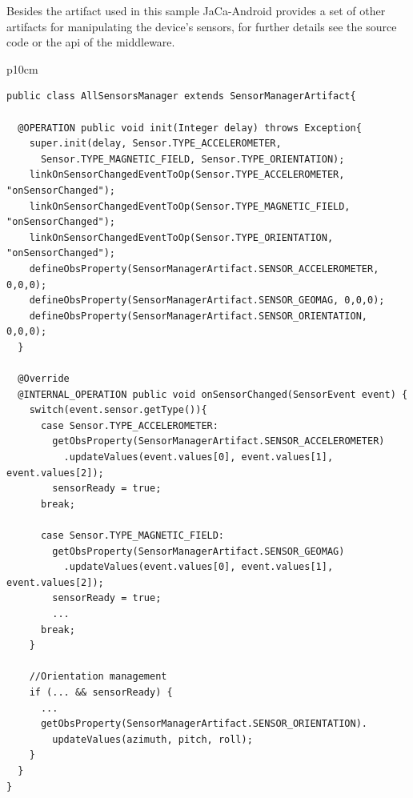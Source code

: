 \documentclass[11pt]{report}
\newcommand\labeltab[1]{\label{tb:#1}}
\newcommand{\jacandroid}{\textsf{JaCa-Android}}
\begin{document}
Besides the artifact used in this sample \jacandroid{} provides a set of other artifacts for manipulating the device's sensors, for further details see the source code or the api of the middleware.


\begin{table}[!ht]
\begin{tabular} {p{10cm}}
\begin{minipage}{10cm}
{\scriptsize \begin{verbatim}
public class AllSensorsManager extends SensorManagerArtifact{

  @OPERATION public void init(Integer delay) throws Exception{
    super.init(delay, Sensor.TYPE_ACCELEROMETER,
      Sensor.TYPE_MAGNETIC_FIELD, Sensor.TYPE_ORIENTATION);
    linkOnSensorChangedEventToOp(Sensor.TYPE_ACCELEROMETER, "onSensorChanged");
    linkOnSensorChangedEventToOp(Sensor.TYPE_MAGNETIC_FIELD, "onSensorChanged");
    linkOnSensorChangedEventToOp(Sensor.TYPE_ORIENTATION, "onSensorChanged");
    defineObsProperty(SensorManagerArtifact.SENSOR_ACCELEROMETER, 0,0,0);
    defineObsProperty(SensorManagerArtifact.SENSOR_GEOMAG, 0,0,0);
    defineObsProperty(SensorManagerArtifact.SENSOR_ORIENTATION, 0,0,0);
  }

  @Override	
  @INTERNAL_OPERATION public void onSensorChanged(SensorEvent event) {
    switch(event.sensor.getType()){
      case Sensor.TYPE_ACCELEROMETER:
        getObsProperty(SensorManagerArtifact.SENSOR_ACCELEROMETER)
          .updateValues(event.values[0], event.values[1], event.values[2]);
        sensorReady = true;
      break;
	
      case Sensor.TYPE_MAGNETIC_FIELD:
        getObsProperty(SensorManagerArtifact.SENSOR_GEOMAG)
          .updateValues(event.values[0], event.values[1], event.values[2]);
        sensorReady = true;
        ...
      break;
    }   
		
    //Orientation management
    if (... && sensorReady) {
      ...
      getObsProperty(SensorManagerArtifact.SENSOR_ORIENTATION).
        updateValues(azimuth, pitch, roll);
    }
  }
}
\end{verbatim}}
\end{minipage}
\end{tabular}
\caption{Source code snippet of the \textsf{AllSensorsManager}.}
    \labeltab{AllSensorsArtifact}
\end{table}
\end{document}
